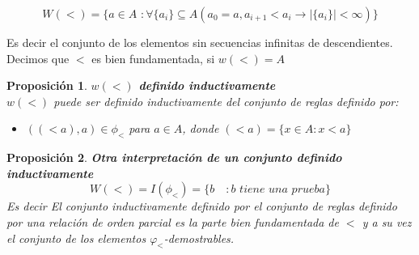 \documentclass[executivepaper]{article}
\newtheorem{propo}{Proposición}[section]
\begin{document}
$$W(<) = \{a\in A\,\, : \forall \{a_i\}\subseteq A (a_0 = a, a_{i+1}<a_i\rightarrow |\{a_i\}|<\infty)\}$$

Es decir el conjunto de los elementos sin secuencias infinitas de descendientes.\\ 
Decimos que $<$ es bien fundamentada, si $w(<) = A$

\begin{propo}\textbf{$w(<)$ definido inductivamente}\\
    $w(<)$ puede ser definido inductivamente del conjunto de reglas definido por:
    \begin{itemize}
        \item $((<a),a) \in\phi_<$ para $a\in A$, donde $(<a) = \{x\in A: x<a\}$    
    \end{itemize} 
\end{propo}

\begin{propo}\textbf{Otra interpretación de un conjunto definido inductivamente}
    $$W(<) = I(\phi_<) = \{b \quad: b\,\, tiene\,\, una\,\, prueba\}$$
    Es decir El conjunto inductivamente definido por el conjunto de reglas definido por una relación de orden parcial es la parte bien fundamentada de $<$ y a su vez el conjunto de los elementos $\varphi_<$-demostrables.
\end{propo}
\end{document}
